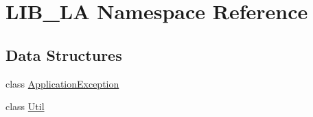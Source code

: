 \hypertarget{namespace_l_i_b___l_a}{}\section{L\+I\+B\+\_\+\+LA Namespace Reference}
\label{namespace_l_i_b___l_a}
\subsection*{Data Structures}
\begin{DoxyCompactItemize}
\item 
class \hyperlink{class_l_i_b___l_a_1_1_application_exception}{Application\+Exception}
\item 
class \hyperlink{class_l_i_b___l_a_1_1_util}{Util}
\end{DoxyCompactItemize}
